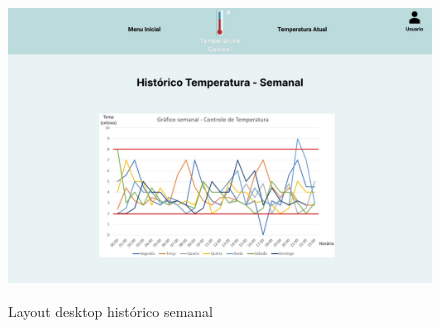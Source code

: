     \begin{figure}[ht]
        \caption{Layout desktop histórico semanal}
        \centering
        \includegraphics[scale=0.35]{img/desktop/temp_semanal.jpeg}
        \label{fig:desktopTempSemanal}
    \end{figure}




